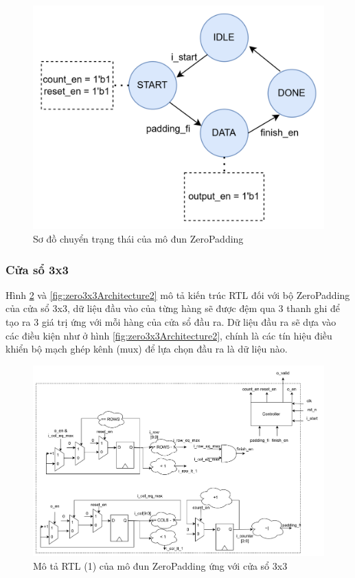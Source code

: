 \begin{figure}[!ht]
    \centering
    \includegraphics[width=0.7\linewidth]{figures/zeroPaddingTrans.png}
    \caption{Sơ đồ chuyển trạng thái của mô đun ZeroPadding}
    \label{fig:zeroPaddingTrans}
\end{figure}


\subsubsection{Cửa sổ 3x3}
Hình \ref{fig:zero3x3Architecture1} và \ref{fig:zero3x3Architecture2} mô tả kiến trúc RTL đối với bộ ZeroPadding của cửa sổ 3x3, dữ liệu đầu vào của từng hàng sẽ được đệm qua 3 thanh ghi để tạo ra 3 giá trị ứng với mỗi hàng của cửa sổ đầu ra. Dữ liệu đầu ra sẽ dựa vào các điều kiện như ở hình \ref{fig:zero3x3Architecture2}, chính là các tín hiệu điều khiển bộ mạch ghép kênh (mux) để lựa chọn đầu ra là dữ liệu nào.
\begin{figure}[!ht]
    \centering
    \includegraphics[width=\linewidth]{figures/zero3x3Architecture1.png}
    \caption{Mô tả RTL (1) của mô đun ZeroPadding ứng với cửa sổ 3x3}
    \label{fig:zero3x3Architecture1}
\end{figure}

